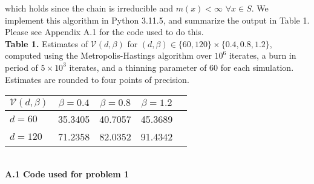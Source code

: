 \documentclass[11pt, letterpaper]{article}
\newcommand{\mc}[1]{\mathcal{#1}}
\begin{document}
    which holds since the chain is irreducible and $m(x)<\infty$ $\forall x\in S$. We implement this algorithm in Python 3.11.5, and summarize the output in Table 1. Please see Appendix A.1
    for the code used to do this.\\[10pt]
    {\bf Table 1.} Estimates of $\mc{V}(d,\beta)$ for $(d,\beta)\in\{60, 120\}\times\{0.4,0.8,1.2\}$, computed using the Metropolis-Hastings algorithm over $10^6$ iterates, a burn in period of $5\times 10^3$
    iterates, and a thinning parameter of $60$ for each simulation. Estimates are rounded to four points of precision.
    \begin{center}
        \begin{tabular}{@{}l|c|c|c|c@{}}\toprule
            $\mc{V}(d,\beta)$ & $\beta=0.4$ & $\beta=0.8$ & $\beta=1.2$ \\\midrule
            $d=60$ & 35.3405 & 40.7057 & 45.3689\\\midrule
            $d=120$ & 71.2358 & 82.0352 & 91.4342\\
            \bottomrule
        \end{tabular}
    \end{center}
    \\[10pt]
    {\bf A.1 Code used for problem 1}
\end{document}
